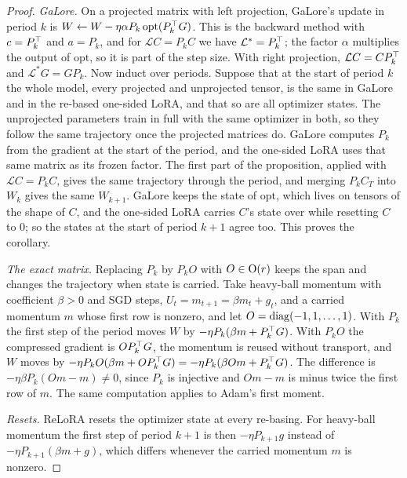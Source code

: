 \begin{proof}
\emph{GaLore.} On a projected matrix with left projection, GaLore's update in period $k$ is
$W\leftarrow W-\eta\alpha P_k\,\mathrm{opt}(P_k^{\top} G)$. This is the backward method with $c=P_k^{\top}$ and $a=P_k$, and for
$\mathcal LC=P_kC$ we have $\mathcal L^*=P_k^{\top}$; the factor $\alpha$ multiplies the output of $\mathrm{opt}$, so it is part
of the step size. With right projection, $\mathcal LC=CP_k^{\top}$ and $\mathcal L^*G=GP_k$. Now induct over periods. Suppose that
at the start of period $k$ the whole model, every projected and unprojected tensor, is the same in GaLore and in the
re-based one-sided LoRA, and that so are all optimizer states. The unprojected parameters train in full with the same
optimizer in both, so they follow the same trajectory once the projected matrices do. GaLore computes $P_k$ from the
gradient at the start of the period, and the one-sided LoRA uses that same matrix as its frozen factor. The first part of
the proposition, applied with $\mathcal LC=P_kC$, gives the same trajectory through the period, and merging $P_kC_T$ into
$W_k$ gives the same $W_{k+1}$. GaLore keeps the state of $\mathrm{opt}$, which lives on tensors of the shape of $C$, and
the one-sided LoRA carries $C$'s state over while resetting $C$ to $0$; so the states at the start of period $k+1$ agree
too. This proves the corollary.

\emph{The exact matrix.} Replacing $P_k$ by $P_kO$ with $O\in\mathrm{O}(r)$ keeps the span and changes the trajectory when state
is carried. Take heavy-ball momentum with coefficient $\beta>0$ and SGD steps, $U_t=m_{t+1}=\beta m_t+g_t$, and a carried
momentum $m$ whose first row is nonzero, and let $O=\operatorname{diag}(-1,1,\dots,1)$. With $P_k$ the first step of the period moves
$W$ by $-\eta P_k(\beta m+P_k^{\top} G)$. With $P_kO$ the compressed gradient is $OP_k^{\top} G$, the momentum is reused without
transport, and $W$ moves by $-\eta P_kO(\beta m+OP_k^{\top} G)=-\eta P_k(\beta Om+P_k^{\top} G)$. The difference is
$-\eta\beta P_k(Om-m)\ne0$, since $P_k$ is injective and $Om-m$ is minus twice the first row of $m$. The same computation
applies to Adam's first moment.

\emph{Resets.} ReLoRA resets the optimizer state at every re-basing. For heavy-ball momentum the first step of period $k+1$
is then $-\eta P_{k+1}g$ instead of $-\eta P_{k+1}(\beta m+g)$, which differs whenever the carried momentum $m$ is
nonzero.


\end{proof}
